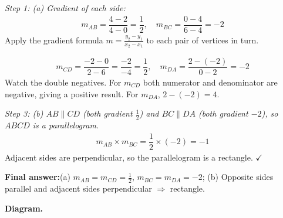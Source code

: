 \documentclass[11pt]{article}
\begin{document}
\textit{Step 1: (a) Gradient of each side:}
\[\begin{gathered}
m_{AB} = \dfrac{4-2}{4-0} = \dfrac{1}{2}, \quad m_{BC} = \dfrac{0-4}{6-4} = -2
\end{gathered}\]
Apply the gradient formula \( m = \frac{y_2 - y_1}{x_2 - x_1} \) to each pair of vertices in turn.

\[\begin{gathered}
m_{CD} = \dfrac{-2-0}{2-6} = \dfrac{-2}{-4} = \dfrac{1}{2}, \quad m_{DA} = \dfrac{2-(-2)}{0-2} = -2
\end{gathered}\]
Watch the double negatives. For \( m_{CD} \) both numerator and denominator are negative, giving a positive result. For \( m_{DA} \), \( 2 - (-2) = 4 \).

\textit{Step 3: (b) \( AB \parallel CD \) (both gradient \( \frac{1}{2} \)) and \( BC \parallel DA \) (both gradient \( -2 \)), so \( ABCD \) is a parallelogram.}
\[\begin{gathered}
m_{AB} \times m_{BC} = \dfrac{1}{2} \times (-2) = -1
\end{gathered}\]
Adjacent sides are perpendicular, so the parallelogram is a rectangle. $\checkmark$

\begin{answerbox}
\textbf{Final answer:}\quad (a) \(\displaystyle m_{AB}=m_{CD}=\frac{1}{2}\), \(\displaystyle m_{BC}=m_{DA}=-2\); (b) Opposite sides parallel and adjacent sides perpendicular $\Rightarrow$ rectangle.
\end{answerbox}
\textbf{Diagram.}
\end{document}
